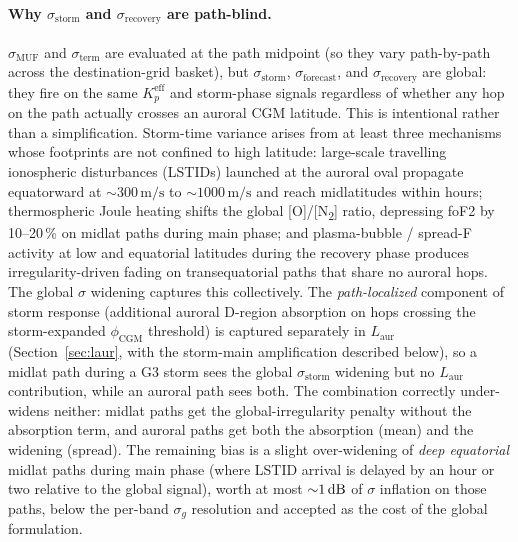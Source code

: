 \documentclass[11pt,a4paper]{article}
\newcommand{\SI}[2]{#1\,\text{#2}}
\newcommand{\dB}{\text{dB}}
\begin{document}
\paragraph{Why $\sigma_{\text{storm}}$ and $\sigma_{\text{recovery}}$
are path-blind.}  $\sigma_{\text{MUF}}$ and $\sigma_{\text{term}}$
are evaluated at the path midpoint (so they vary path-by-path
across the destination-grid basket), but
$\sigma_{\text{storm}}$, $\sigma_{\text{forecast}}$, and
$\sigma_{\text{recovery}}$ are global: they fire on the same
$K_p^{\text{eff}}$ and storm-phase signals regardless of whether
any hop on the path actually crosses an auroral CGM latitude.  This
is intentional rather than a simplification.  Storm-time variance
arises from at least three mechanisms whose footprints are not
confined to high latitude: large-scale travelling ionospheric
disturbances (LSTIDs) launched at the auroral oval propagate
equatorward at ${\sim}\SI{300}{m/s}$ to ${\sim}\SI{1000}{m/s}$ and
reach midlatitudes within hours; thermospheric Joule heating
shifts the global [O]/[N\textsubscript{2}] ratio, depressing
foF2 by 10--20\,\% on midlat paths during main phase; and
plasma-bubble / spread-F activity at low and equatorial latitudes
during the recovery phase produces irregularity-driven fading on
transequatorial paths that share no auroral hops.  The global
$\sigma$ widening captures this collectively.  The
\emph{path-localized} component of storm response (additional
auroral D-region absorption on hops crossing the storm-expanded
$\phi_{\text{CGM}}$ threshold) is captured separately in
$L_{\text{aur}}$ (Section~\ref{sec:laur}, with the
storm-main amplification described below), so a midlat path during a
G3 storm sees the global $\sigma_{\text{storm}}$ widening but no
$L_{\text{aur}}$ contribution, while an auroral path sees both.
The combination correctly under-widens neither: midlat paths get
the global-irregularity penalty without the absorption term, and
auroral paths get both the absorption (mean) and the widening
(spread).  The remaining bias is a slight over-widening of
\emph{deep equatorial} midlat paths during main phase (where LSTID
arrival is delayed by an hour or two relative to the global signal),
worth at most ${\sim}\SI{1}{\dB}$ of $\sigma$ inflation on those
paths, below the per-band $\sigma_g$ resolution and accepted as
the cost of the global formulation.
\end{document}
